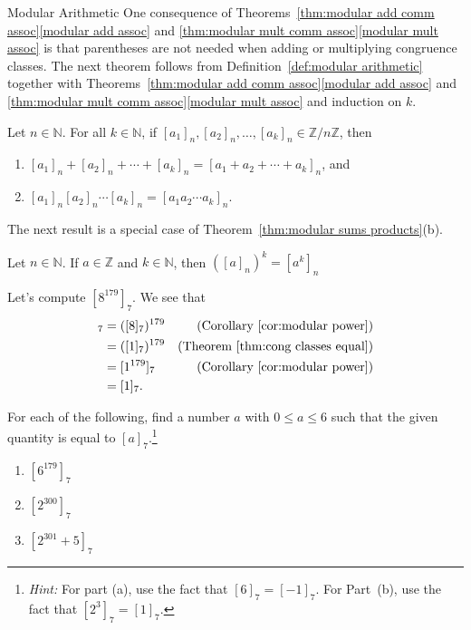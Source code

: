 \begin{section}{Modular Arithmetic}
One consequence of Theorems~\ref{thm:modular add comm assoc}\ref{modular add assoc} and \ref{thm:modular mult comm assoc}\ref{modular mult assoc} is that parentheses are not needed when adding or multiplying congruence classes.  The next theorem follows from Definition~\ref{def:modular arithmetic} together with Theorems~\ref{thm:modular add comm assoc}\ref{modular add assoc} and \ref{thm:modular mult comm assoc}\ref{modular mult assoc} and induction on $k$.

\begin{theorem}\label{thm:modular sums products}
Let $n\in \mathbb{N}$.  For all $k\in \mathbb{N}$, if $[a_1]_n,[a_2]_n,\ldots, [a_k]_n \in \mathbb{Z}/n\mathbb{Z}$, then 
\begin{enumerate}[label=\textrm{(\alph*)}]
\item $[a_1]_n+[a_2]_n+\cdots+ [a_k]_n = [a_1 + a_2 +\cdots+ a_k]_n$, and
\item $[a_1]_n [a_2]_n \cdots  [a_k]_n = [a_1 a_2 \cdots a_k]_n$.
\end{enumerate}
\end{theorem}

The next result is a special case of Theorem~\ref{thm:modular sums products}(b).

\begin{corollary}\label{cor:modular power}
Let $n\in \mathbb{N}$. If $a\in\mathbb{Z}$ and $k\in \mathbb{N}$, then $([a]_n)^k = [a^k]_n$
\end{corollary}

\begin{example}
Let's compute $[8^{179}]_7$.  We see that
\begin{align*}
[8^{179}]_7 & = ([8]_7)^{179} & (\text{Corollary~\ref{cor:modular power}})\\
& = ([1]_7)^{179} & (\text{Theorem~\ref{thm:cong classes equal}})\\
& = [1^{179}]_7 & (\text{Corollary~\ref{cor:modular power}})\\
& = [1]_7.
\end{align*}
\end{example}

\begin{problem}
For each of the following, find a number $a$ with $0\le a \le 6$ such that the given quantity is equal to $[a]_7$.\footnote{\emph{Hint:} For part (a), use the fact that $[6]_7 = [-1]_7$. For Part~(b), use the fact that $[2^3]_7 = [1]_7$.}
\begin{enumerate}[label=\textrm{(\alph*)}]
\item $[6^{179}]_7$
\item $[2^{300}]_7$
\item $[2^{301} +5]_7$
\end{enumerate}
\end{problem}


\end{section}
